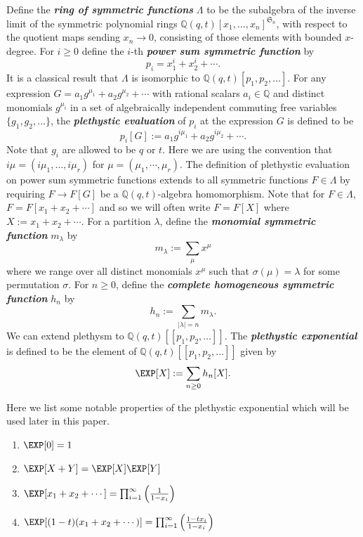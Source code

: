  \begin{defi}\label{sym functions defn}
 Define the \textbf{\textit{ring of symmetric functions}} $\Lambda$ to be the subalgebra of the inverse limit of the symmetric polynomial rings $\mathbb{Q}(q,t)[x_1,\ldots,x_n]^{\mathfrak{S}_n}$, with respect to the quotient maps sending $x_n \rightarrow 0$, consisting of those elements with bounded $x$-degree. For $i \geq 0$ define the $i$-th \textbf{\textit{power sum symmetric function}} by
 $$p_i = x_1^i + x_2^i + \cdots .$$ It is a classical result that $\Lambda$ is isomorphic to $\mathbb{Q}(q,t)[p_1,p_2,\ldots]$. For any expression $G = a_1g^{\mu_1} + a_2g^{\mu_2} +\cdots$ with rational scalars $a_i \in \mathbb{Q}$ and distinct monomials $g^{\mu_i}$ in a set of algebraically independent commuting free variables $\{g_1,g_2,\ldots\}$, the \textbf{\textit{plethystic evaluation}} of $p_i$ at the expression $G$ is defined to be $$p_i[G] := a_1g^{i\mu_1} +a_2g^{i \mu_2}+ \cdots .$$ Note that $g_i$ are allowed to be $q$ or $t.$ Here we are using the convention that $i\mu = (i\mu_1,\ldots, i \mu_r)$ for $\mu = (\mu_1,\cdots, \mu_r).$ The definition of plethystic evaluation on power sum symmetric functions extends to all symmetric functions $F \in \Lambda$ by requiring $F \rightarrow F[G]$ be a $\mathbb{Q}(q,t)$-algebra homomorphism. Note that for $F \in \Lambda$, $F = F[x_1+x_2+ \cdots]$ and so we will often write $F = F[X]$ where $X:= x_1+ x_2 + \cdots.$ For a partition $\lambda$, define the \textbf{\textit{monomial symmetric function}} $m_\lambda$ by 
 $$m_\lambda := \sum_{\mu} x^{\mu}$$
 where we range over all distinct monomials $x^{\mu}$ such that $\sigma(\mu) = \lambda$ for some permutation $\sigma$. For $n \geq 0$, define the \textbf{\textit{complete homogeneous symmetric function}} $h_n$ by 
 $$h_n:= \sum_{|\lambda|= n} m_\lambda .$$ We can extend plethysm to $\mathbb{Q}(q,t)[[p_1,p_2,\ldots]]$.  The \textbf{\textit{plethystic exponential}} is defined to be the element of $\mathbb{Q}(q,t)[[p_1,p_2,\ldots]]$ given by 
 $$\EXP[X]:= \sum_{n \geq 0} h_n[X].$$ 
 \end{defi}


Here we list some notable properties of the plethystic exponential which will be used later in this paper.

\begin{enumerate}
    \item $\EXP[0] = 1$
    \item $\EXP[X+Y]= \EXP[X]\EXP[Y]$
    \item $\EXP[x_1+x_2+\cdots] = \prod_{i=1}^{\infty} \left( \frac{1}{1-x_i} \right)$
    \item $\EXP[(1-t)(x_1+x_2+\cdots)] = \prod_{i=1}^{\infty} \left( \frac{1-tx_i}{1-x_i} \right)$
\end{enumerate}

